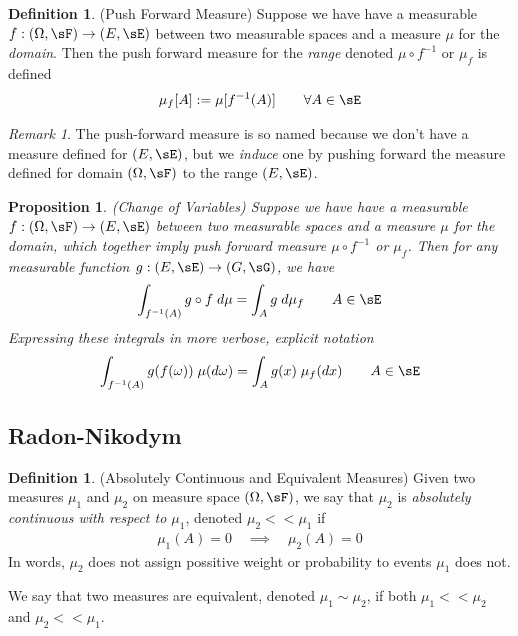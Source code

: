 \documentclass[12pt]{article}
\theoremstyle{plain}
\newtheorem{prop}[thm]{Proposition}
\theoremstyle{definition}
\newtheorem{defn}[thm]{Definition}
\theoremstyle{remark}
\newtheorem*{rmk}{Remark}
\newcommand{\ra}{\rightarrow}
\begin{document}
\begin{defn}(Push Forward Measure)
\label{defn:pushfwd}
Suppose we have have a measurable $f:(\Omega,\sF)\ra (E,\sE)$ between
two measurable spaces and a measure $\mu$ for the \emph{domain}.
Then the push forward measure for the \emph{range} denoted $\mu \circ
f^{-1}$ or $\mu_f$ is defined
\begin{align*}
  \mu_f[A] := \mu[f^{-1}(A)]
  \qquad\forall A \in\sE
\end{align*}
\end{defn}
\begin{rmk}
The push-forward measure is so named because we don't have a measure
defined for $(E,\sE)$, but we \emph{induce} one by pushing forward the
measure defined for domain $(\Omega,\sF)$ to the range $(E,\sE)$.
\end{rmk}

\begin{prop}\emph{(Change of Variables)}
\label{prop:changeofvars}
Suppose we have have a measurable $f:(\Omega,\sF)\ra (E,\sE)$ between
two measurable spaces and a measure $\mu$ for the \emph{domain}, which
together imply push forward measure $\mu \circ f^{-1}$ or $\mu_f$. Then
for any measurable function $g:(E,\sE)\ra(G,\sG)$, we have
\begin{align*}
  \int_{f^{-1}(A)} g\circ f \; d\mu
  =
  \int_A g\;d\mu_f
  \qquad A \in \sE
\end{align*}
Expressing these integrals in more verbose, explicit notation
\begin{align*}
  \int_{f^{-1}(A)} g(f(\omega)) \; \mu(d\omega)
  =
  \int_A g(x)\;\mu_f(dx)
  \qquad A \in \sE
\end{align*}
\end{prop}

\clearpage
\subsection{Radon-Nikodym}

\begin{defn}(Absolutely Continuous and Equivalent Measures)
Given two measures $\mu_1$ and $\mu_2$ on measure space $(\Omega,\sF)$,
we say that $\mu_2$ is
\emph{absolutely continuous with respect to $\mu_1$}, denoted
$\mu_2<<\mu_1$ if
\begin{align*}
  \mu_1(A) = 0
  \quad\implies\quad
  \mu_2(A) = 0
\end{align*}
In words, $\mu_2$ does not assign possitive weight or probability to
events $\mu_1$ does not.

We say that two measures are equivalent, denoted $\mu_1\sim \mu_2$, if
both $\mu_1<<\mu_2$ and $\mu_2<<\mu_1$.
\end{defn}
\end{document}
